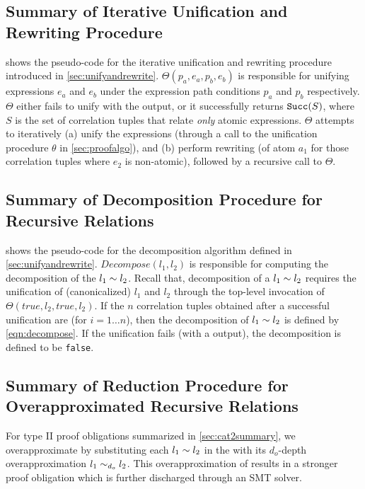 

\subsection{Summary of Iterative Unification and Rewriting Procedure}
\label{sec:unifyandrewritealgo}
 shows the pseudo-code for the iterative unification and rewriting procedure
introduced in \cref{sec:unifyandrewrite}.
$\Theta(p_a,e_a,p_b,e_b)$ is responsible for unifying expressions $e_a$ and $e_b$ under the expression
path conditions $p_a$ and $p_b$ respectively.
$\Theta$ either fails to unify with the  output, or it successfully returns ${\tt Succ}(S)$, where $S$
is the set of correlation tuples that relate {\em only} atomic expressions.
$\Theta$ attempts to iteratively (a) unify the expressions (through a call to the unification procedure $\theta$ in \cref{sec:proofalgo}),
and (b) perform rewriting (of atom $a_1$ for those correlation tuples  where $e_2$ is non-atomic), followed by
a recursive call to $\Theta$.



\subsection{Summary of Decomposition Procedure for Recursive Relations}
\label{sec:decomposealgo}
 shows the pseudo-code for the decomposition algorithm defined in \cref{sec:unifyandrewrite}.
$Decompose(l_1, l_2)$ is responsible for computing the decomposition of the \recursiveRelation{} $l_1 \sim{} l_2$.
Recall that, decomposition of a \recursiveRelation{} $l_1 \sim{} l_2$ requires the unification of (canonicalized)
$l_1$ and $l_2$ through the top-level invocation of $\Theta(true,l_2,true,l_2)$.
If the $n$ correlation tuples obtained after a successful unification are 
(for $i=1\ldots n$), then the decomposition of $l_1 \sim{} l_2$ is defined by \cref{eqn:decompose}.
If the unification fails (with a  output), the decomposition is defined to be {\tt false}.



\subsection{Summary of Reduction Procedure for Overapproximated Recursive Relations}
\label{sec:overapproxalgo}
For type II proof obligations summarized in \cref{sec:cat2summary},
we overapproximate \lhs{} by substituting each \recursiveRelations{} $l_1 \sim{} l_2$ in the \lhs{}
with its $d_o$-depth overapproximation $l_1 \sim_{d_o} l_2$.
This overapproximation of \lhs{} results in a stronger proof obligation which is further
discharged through an SMT solver.

